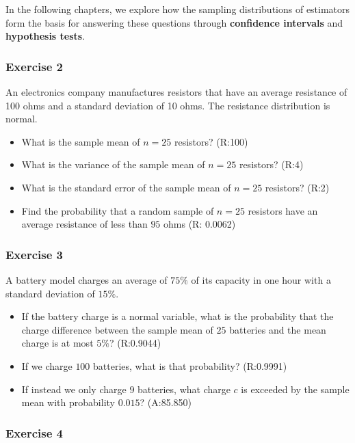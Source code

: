 \documentclass[
]{book}
\begin{document}
In the following chapters, we explore how the sampling distributions of estimators form the basis for answering these questions through \textbf{confidence intervals} and \textbf{hypothesis tests}.

\hypertarget{exercise-2-7}{%
\subsubsection{Exercise 2}\label{exercise-2-7}}

An electronics company manufactures resistors that have an average resistance of 100 ohms and
a standard deviation of 10 ohms. The resistance distribution is normal.

\begin{itemize}
\item
  What is the sample mean of \(n=25\) resistors? (R:100)
\item
  What is the variance of the sample mean of \(n=25\) resistors? (R:4)
\item
  What is the standard error of the sample mean of \(n=25\) resistors? (R:2)
\item
  Find the probability
  that a random sample of \(n = 25\) resistors have an average resistance of less than \(95\) ohms (R: 0.0062)
\end{itemize}

\hypertarget{exercise-3-5}{%
\subsubsection{Exercise 3}\label{exercise-3-5}}

A battery model charges an average of \(75\%\) of its capacity in one hour with a standard deviation of \(15\%\).

\begin{itemize}
\item
  If the battery charge is a normal variable, what is the probability that the charge difference between the sample mean of \(25\) batteries and the mean charge is at most \(5\%\)? (R:0.9044)
\item
  If we charge \(100\) batteries, what is that probability? (R:0.9991)
\item
  If instead we only charge \(9\) batteries, what charge \(c\) is exceeded by the sample mean with probability \(0.015\)? (A:85.850)
\end{itemize}

\hypertarget{exercise-4-4}{%
\subsubsection{Exercise 4}\label{exercise-4-4}}
\end{document}
